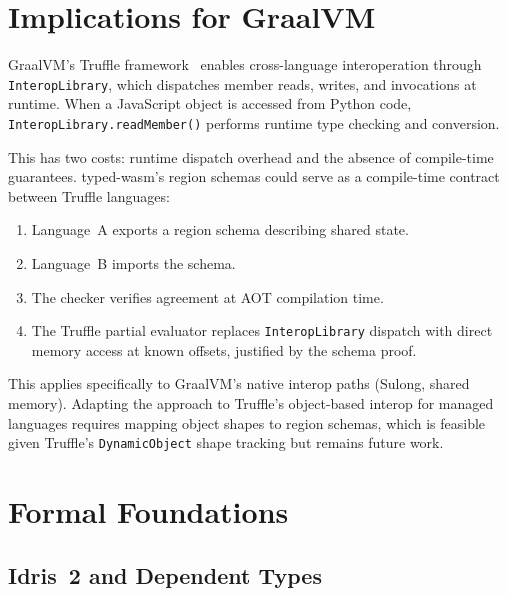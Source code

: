 \documentclass[sigplan,nonacm,screen]{acmart}
\begin{document}
\section{Implications for GraalVM}
\label{sec:graalvm}

GraalVM's Truffle framework~\cite{wurthinger2017} enables cross-language
interoperation through \texttt{InteropLibrary}, which dispatches member
reads, writes, and invocations at runtime. When a JavaScript object is
accessed from Python code, \texttt{InteropLibrary.readMember()} performs
runtime type checking and conversion.

This has two costs: runtime dispatch overhead and the absence of
compile-time guarantees. typed-wasm's region schemas could serve as a
compile-time contract between Truffle languages:

\begin{enumerate}
  \item Language~A exports a region schema describing shared state.
  \item Language~B imports the schema.
  \item The checker verifies agreement at AOT compilation time.
  \item The Truffle partial evaluator replaces \texttt{InteropLibrary}
    dispatch with direct memory access at known offsets, justified by the
    schema proof.
\end{enumerate}

This applies specifically to GraalVM's native interop paths (Sulong,
shared memory). Adapting the approach to Truffle's object-based interop
for managed languages requires mapping object shapes to region schemas,
which is feasible given Truffle's \texttt{DynamicObject} shape tracking
but remains future work.

\section{Formal Foundations}
\label{sec:formal}

\subsection{Idris~2 and Dependent Types}
\end{document}
